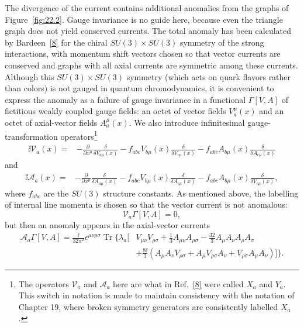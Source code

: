 The divergence of the current contains additional anomalies from the graphs
of Figure~\ref{fig:22.2}. Gauge invariance is no guide here, because even
the triangle graph does not yield conserved currents. The total anomaly has
been calculated by Bardeen~\hyperref[ch22-ref-8]{[8]} for the chiral
$SU(3)\times SU(3)$ symmetry of the strong interactions, with momentum shift
vectors chosen so that vector currents are conserved and graphs with all
axial currents are symmetric among these currents. Although this
$SU(3)\times SU(3)$ symmetry (which acts on quark flavors rather than colors)
is not gauged in quantum chromodynamics, it is convenient to express the
anomaly as a failure of gauge invariance in a functional $\Gamma[V,A]$ of
fictitious weakly coupled gauge fields: an octet of vector fields
$V_a^\mu(x)$ and an octet of axial-vector fields $A_a^\mu(x)$. We also
introduce infinitesimal gauge-transformation operators\footnote{The
operators $\mathcal V_a$ and $\mathcal A_a$ here are what in
Ref.~\hyperref[ch22-ref-8]{[8]} were called $X_a$ and $Y_a$. This switch in
notation is made to maintain consistency with the notation of Chapter 19,
where broken symmetry generators are consistently labelled $X_a$.}
\begin{equation}
 \begin{aligned}
 \ii\mathcal V_a(x)
 ={}&-\frac{\partial}{\partial x^\mu}
 \frac{\delta}{\delta V_{a\mu}(x)}
 -f_{abc}V_{b\mu}(x)\frac{\delta}{\delta V_{c\mu}(x)}
 -f_{abc}A_{b\mu}(x)\frac{\delta}{\delta A_{c\mu}(x)}
 \end{aligned}
 \tag{22.3.31}\label{eq:22.3.31}
\end{equation}
and
\begin{equation}
 \begin{aligned}
 \ii\mathcal A_a(x)
 ={}&-\frac{\partial}{\partial x^\mu}
 \frac{\delta}{\delta A_{a\mu}(x)}
 -f_{abc}V_{b\mu}(x)\frac{\delta}{\delta A_{c\mu}(x)}
 -f_{abc}A_{b\mu}(x)\frac{\delta}{\delta V_{c\mu}(x)},
 \end{aligned}
 \tag{22.3.32}\label{eq:22.3.32}
\end{equation}
where $f_{abc}$ are the $SU(3)$ structure constants. As mentioned above,
the labelling of internal line momenta is chosen so that the vector current
is not anomalous:
\begin{equation}
 \mathcal V_a\Gamma[V,A]=0,
 \tag{22.3.33}\label{eq:22.3.33}
\end{equation}
but then an anomaly appears in the axial-vector currents
\begin{equation}
 \begin{aligned}
 \mathcal A_a\Gamma[V,A]
 =\frac{\ii}{32\pi^2}\epsilon^{\mu\nu\rho\sigma}
 \operatorname{Tr}\Biggl\{\lambda_a\Biggl[
 &V_{\mu\nu}V_{\rho\sigma}
 +\frac13A_{\mu\nu}A_{\rho\sigma}
 -\frac{32}{3}A_\mu A_\nu A_\rho A_\sigma
 \\
 &+\frac{8\ii}{3}\left(
  A_\mu A_\nu V_{\rho\sigma}
  +A_\mu V_{\rho\sigma}A_\nu
  +V_{\rho\sigma}A_\mu A_\nu
 \right)
 \Biggr]\Biggr\}.
 \end{aligned}
 \tag{22.3.34}\label{eq:22.3.34}
\end{equation}

